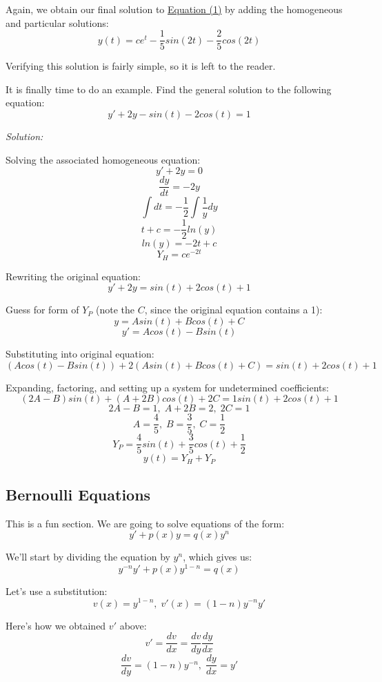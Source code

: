 Again, we obtain our final solution to \hyperref[uceq1]{Equation (1)} by adding the homogeneous and particular solutions:
$$y(t) = ce^{t} -\frac{1}{5}sin(2t) -\frac{2}{5}cos(2t)$$

Verifying this solution is fairly simple, so it is left to the reader.

It is finally time to do an example. Find the general solution to the following equation:
$$y' + 2y - sin(t) - 2cos(t) = 1$$

\textit{Solution:}

Solving the associated homogeneous equation:
$$y' + 2y = 0$$
$$\frac{dy}{dt} = -2y$$
$$\int dt = -\frac{1}{2}\int \frac{1}{y}dy$$
$$t + c = -\frac{1}{2}ln(y)$$
$$ln(y) = -2t + c$$
$$Y_{H} = ce^{-2t}$$

Rewriting the original equation:
$$y' + 2y = sin(t) + 2cos(t) + 1$$

Guess for form of $Y_{P}$ (note the $C$, since the original equation contains a 1):
$$y = Asin(t) + Bcos(t) + C$$ \vspace{-2.5em}
$$y' = Acos(t) - Bsin(t)$$

Substituting into original equation:
$$(Acos(t) - Bsin(t)) + 2(Asin(t) + Bcos(t) + C) = sin(t) + 2cos(t) + 1$$

Expanding, factoring, and setting up a system for undetermined coefficients:
$$(2A - B)sin(t) + (A + 2B)cos(t) + 2C = 1sin(t) + 2cos(t) + 1$$
$$2A - B = 1,\; A + 2B = 2,\; 2C = 1$$
$$A = \frac{4}{5},\; B = \frac{3}{5},\; C = \frac{1}{2}$$
$$Y_{P} = \frac{4}{5}sin(t) + \frac{3}{5}cos(t) + \frac{1}{2}$$
$$y(t) = Y_{H} + Y_{P}$$
\begin{center}
\end{center}

\subsection{Bernoulli Equations}
This is a fun section. We are going to solve equations of the form:
$$y' + p(x)y = q(x)y^{n}$$

We'll start by dividing the equation by $y^{n}$, which gives us:
\begin{equation}
	y^{-n}y' + p(x)y^{1 - n} = q(x)
\end{equation}

Let's use a substitution:
$$v(x) = y^{1 - n},\; v'(x) = (1 - n)y^{-n}y'$$

Here's how we obtained $v'$ above:
$$v' = \frac{dv}{dx} = \frac{dv}{dy}\frac{dy}{dx}$$
$$\frac{dv}{dy} = (1 - n)y^{-n},\; \frac{dy}{dx} = y'$$

